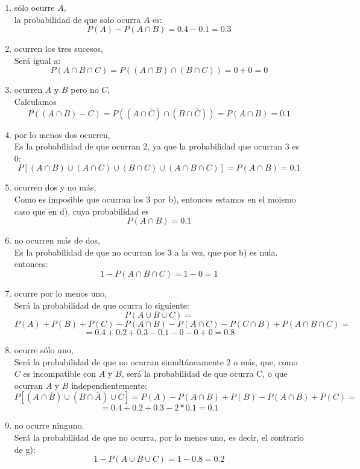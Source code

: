 \documentclass[a4paper,12pt]{article}
\begin{document}
\begin{enumerate}
    \begin{enumerate}[label=\alph*)]
    \item sólo ocurre \(A\),\\
    la probabilidad de que solo ocurra \(A\) es: $$P(A)-P(A\cap B)= 0.4-0.1=0.3$$
    \item ocurren los tres sucesos,\\
    Será igual a: $$P(A\cap B\cap C)=P( (A\cap B) \cap (B\cap C))= 0+0=0$$
    \item ocurren \(A\) y \(B\) pero no \(C\),\\
    Calculamos $$P((A\cap B)-C)=P( (A\cap \bar C) \cap (B\cap \bar C) )= P(A\cap B)= 0.1$$
    \item por lo menos dos ocurren,\\
    Es la probabilidad de que ocurran 2, ya que la probabilidad que ocurran 3 es 0: $$P[( A\cap B ) \cup (A\cap C)\cup (B\cap C)\cup (A\cap B \cap C)]= P(A\cap B) = 0.1$$
    \item ocurren dos y no más,\\
    Como es imposible que ocurran los 3 por b), entonces estamos en el moismo caso que en d), cuya probabilidad es $$P(A\cap B)=0.1$$
    \item no ocurren más de dos,\\
    Es la probabilidad de que no ocurran los 3 a la vez, que por b) es nula. entonces: $$1-P(A\cap B\cap C) = 1-0 =1$$
    \item ocurre por lo menos uno,\\
    Será la probabilidad de que ocurra lo siguiente: $$P(A\cup  B\cup C)=$$
    $$P(A) +  P(B) + P(C) - P(A\cap B) - P(A\cap C) - P(C\cap B) + P(A\cap B\cap C) =$$
     $$=0.4 + 0.2 + 0.3 - 0.1 - 0-0+0=0.8$$
    \item ocurre sólo uno,\\
    Será la probabilidad de que no ocurran simultáneamente 2 o más, que, como $C$ es incompatible con $A$ y $B$, será la probabilidad de que ocurra C, o que ocurran $A$ y $B$ independientemente: $$P[(A\cap\bar B) \cup (B\cap\bar A) \cup C]= P(A) - P(A\cap B) + P(B) -P (A\cap B) + P(C)=$$ $$= 0.4+0.2+0.3-2*0.1=0.1$$
    \item no ocurre ninguno.\\
    Será la probabilidad de que no ocurra, por lo menos uno, es decir, el contrario de g): $$1-P(A\cup B\cup C)= 1-0.8=0.2$$
    \end{enumerate}
    

\end{enumerate}
\end{document}
